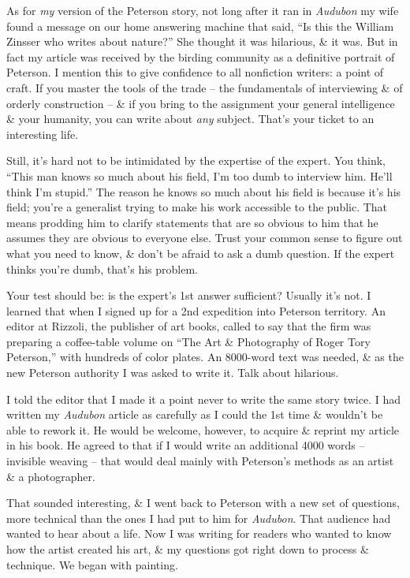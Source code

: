 \documentclass{article}
\numberwithin{equation}{section}
\begin{document}
As for \textit{my} version of the Peterson story, not long after it ran in \textit{Audubon} my wife found a message on our home answering machine that said, ``Is this the William Zinsser who writes about nature?'' She thought it was hilarious, \& it was. But in fact my article was received by the birding community as a definitive portrait of Peterson. I mention this to give confidence to all nonfiction writers: a point of craft. If you master the tools of the trade -- the fundamentals of interviewing \& of orderly construction -- \& if you bring to the assignment your general intelligence \& your humanity, you can write about \textit{any} subject. That's your ticket to an interesting life.

Still, it's hard not to be intimidated by the expertise of the expert. You think, ``This man knows so much about his field, I'm too dumb to interview him. He'll think I'm stupid.'' The reason he knows so much about his field is because it's his field; you're a generalist trying to make his work accessible to the public. That means prodding him to clarify statements that are so obvious to him that he assumes they are obvious to everyone else. Trust your common sense to figure out what you need to know, \& don't be afraid to ask a dumb question. If the expert thinks you're dumb, that's his problem.

Your test should be: is the expert's 1st answer sufficient? Usually it's not. I learned that when I signed up for a 2nd expedition into Peterson territory. An editor at Rizzoli, the publisher of art books, called to say that the firm was preparing a coffee-table volume on ``The Art \& Photography of Roger Tory Peterson,'' with hundreds of color plates. An 8000-word text was needed, \& as the new Peterson authority I was asked to write it. Talk about hilarious.

I told the editor that I made it a point never to write the same story twice. I had written my \textit{Audubon} article as carefully as I could the 1st time \& wouldn't be able to rework it. He would be welcome, however, to acquire \& reprint my article in his book. He agreed to that if I would write an additional 4000 words -- invisible weaving -- that would deal mainly with Peterson's methods as an artist \& a photographer.

That sounded interesting, \& I went back to Peterson with a new set of questions, more technical than the ones I had put to him for \textit{Audubon}. That audience had wanted to hear about a life. Now I was writing for readers who wanted to know how the artist created his art, \& my questions got right down to process \& technique. We began with painting.
\end{document}
